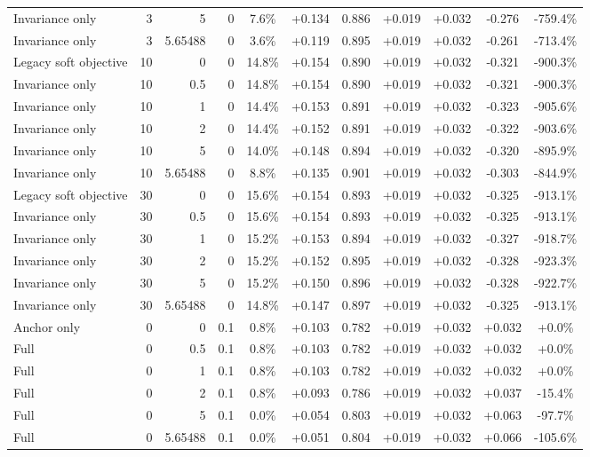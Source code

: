 \begin{table}[htbp]
\begin{tabular}{lrrrccccccc}
Invariance only & 3 & 5 & 0 & 7.6\% & +0.134 & 0.886 & +0.019 & +0.032 & -0.276 & -759.4\% \\
Invariance only & 3 & 5.65488 & 0 & 3.6\% & +0.119 & 0.895 & +0.019 & +0.032 & -0.261 & -713.4\% \\
Legacy soft objective & 10 & 0 & 0 & 14.8\% & +0.154 & 0.890 & +0.019 & +0.032 & -0.321 & -900.3\% \\
Invariance only & 10 & 0.5 & 0 & 14.8\% & +0.154 & 0.890 & +0.019 & +0.032 & -0.321 & -900.3\% \\
Invariance only & 10 & 1 & 0 & 14.4\% & +0.153 & 0.891 & +0.019 & +0.032 & -0.323 & -905.6\% \\
Invariance only & 10 & 2 & 0 & 14.4\% & +0.152 & 0.891 & +0.019 & +0.032 & -0.322 & -903.6\% \\
Invariance only & 10 & 5 & 0 & 14.0\% & +0.148 & 0.894 & +0.019 & +0.032 & -0.320 & -895.9\% \\
Invariance only & 10 & 5.65488 & 0 & 8.8\% & +0.135 & 0.901 & +0.019 & +0.032 & -0.303 & -844.9\% \\
Legacy soft objective & 30 & 0 & 0 & 15.6\% & +0.154 & 0.893 & +0.019 & +0.032 & -0.325 & -913.1\% \\
Invariance only & 30 & 0.5 & 0 & 15.6\% & +0.154 & 0.893 & +0.019 & +0.032 & -0.325 & -913.1\% \\
Invariance only & 30 & 1 & 0 & 15.2\% & +0.153 & 0.894 & +0.019 & +0.032 & -0.327 & -918.7\% \\
Invariance only & 30 & 2 & 0 & 15.2\% & +0.152 & 0.895 & +0.019 & +0.032 & -0.328 & -923.3\% \\
Invariance only & 30 & 5 & 0 & 15.2\% & +0.150 & 0.896 & +0.019 & +0.032 & -0.328 & -922.7\% \\
Invariance only & 30 & 5.65488 & 0 & 14.8\% & +0.147 & 0.897 & +0.019 & +0.032 & -0.325 & -913.1\% \\
Anchor only & 0 & 0 & 0.1 & 0.8\% & +0.103 & 0.782 & +0.019 & +0.032 & +0.032 & +0.0\% \\
Full & 0 & 0.5 & 0.1 & 0.8\% & +0.103 & 0.782 & +0.019 & +0.032 & +0.032 & +0.0\% \\
Full & 0 & 1 & 0.1 & 0.8\% & +0.103 & 0.782 & +0.019 & +0.032 & +0.032 & +0.0\% \\
Full & 0 & 2 & 0.1 & 0.8\% & +0.093 & 0.786 & +0.019 & +0.032 & +0.037 & -15.4\% \\
Full & 0 & 5 & 0.1 & 0.0\% & +0.054 & 0.803 & +0.019 & +0.032 & +0.063 & -97.7\% \\
Full & 0 & 5.65488 & 0.1 & 0.0\% & +0.051 & 0.804 & +0.019 & +0.032 & +0.066 & -105.6\% \\

\end{tabular}
\end{table}
